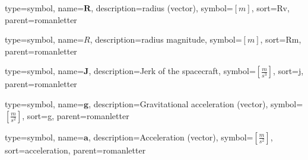 {
type=symbol, %
name={\ensuremath{\mathbf{R}}}, %
description={radius (vector)}, %
symbol={$\left[m\right]$}, %
sort=Rv, %
parent=romanletter %
}

{
type=symbol, %
name={\ensuremath{R}}, %
description={radius magnitude}, %
symbol={$\left[m\right]$}, %
sort=Rm, %
parent=romanletter %
}

{
type=symbol, %
name={\ensuremath{\mathbf{J}}}, %
description={Jerk of the spacecraft}, %
symbol={$\left[\frac{m}{s^3}\right]$}, %
sort=j, %
parent=romanletter %
}

{
type=symbol, %
name={\ensuremath{\mathbf{g}}}, %
description={Gravitational acceleration (vector)}, %
symbol={$\left[\frac{m}{s^2}\right]$}, %
sort=g, %
parent=romanletter %
}

{
type=symbol, %
name={\ensuremath{\mathbf{a}}}, %
description={Acceleration (vector)}, %
symbol={$\left[\frac{m}{s^2}\right]$}, %
sort=acceleration, %
parent=romanletter %
}

